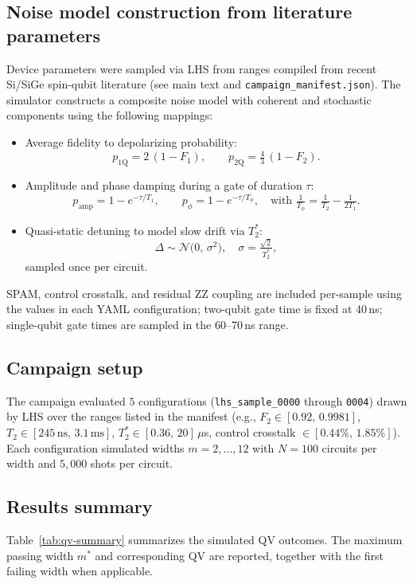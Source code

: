 \subsection{Noise model construction from literature parameters}
Device parameters were sampled via LHS from ranges compiled from recent Si/SiGe spin-qubit literature (see main text and \texttt{campaign\_manifest.json}). The simulator constructs a composite noise model with coherent and stochastic components using the following mappings:
\begin{itemize}
    \item Average fidelity to depolarizing probability:
    \[
      p_{1\mathrm{Q}} = 2\,(1 - F_1),\qquad p_{2\mathrm{Q}} = \tfrac{4}{3}\,(1 - F_2).
    \]
    \item Amplitude and phase damping during a gate of duration $\tau$:
    \[
      p_\mathrm{amp} = 1 - e^{-\tau/T_1},\qquad p_\phi = 1 - e^{-\tau/T_\phi},\quad \text{with } \tfrac{1}{T_\phi} = \tfrac{1}{T_2} - \tfrac{1}{2T_1}.
    \]
    \item Quasi-static detuning to model slow drift via $T_2^*$:
    \[
      \Delta \sim \mathcal{N}\!\bigl(0,\,\sigma^2\bigr),\quad \sigma = \tfrac{\sqrt{2}}{T_2^*},
    \]
    sampled once per circuit.
\end{itemize}
SPAM, control crosstalk, and residual ZZ coupling are included per-sample using the values in each YAML configuration; two-qubit gate time is fixed at 40\,ns; single-qubit gate times are sampled in the 60--70\,ns range.

\subsection{Campaign setup}
The campaign evaluated $5$ configurations (\texttt{lhs\_sample\_0000} through \texttt{0004}) drawn by LHS over the ranges listed in the manifest (e.g., $F_2\in[0.92,\,0.9981]$, $T_2\in[245\,\mathrm{ns},\,3.1\,\mathrm{ms}]$, $T_2^*\in[0.36,\,20]$\,$\mu$s, control crosstalk $\in[0.44\%,\,1.85\%]$). Each configuration simulated widths $m=2,\dots,12$ with $N=100$ circuits per width and $5{,}000$ shots per circuit.

\subsection{Results summary}
Table~\ref{tab:qv-summary} summarizes the simulated QV outcomes. The maximum passing width $m^*$ and corresponding QV are reported, together with the first failing width when applicable.

